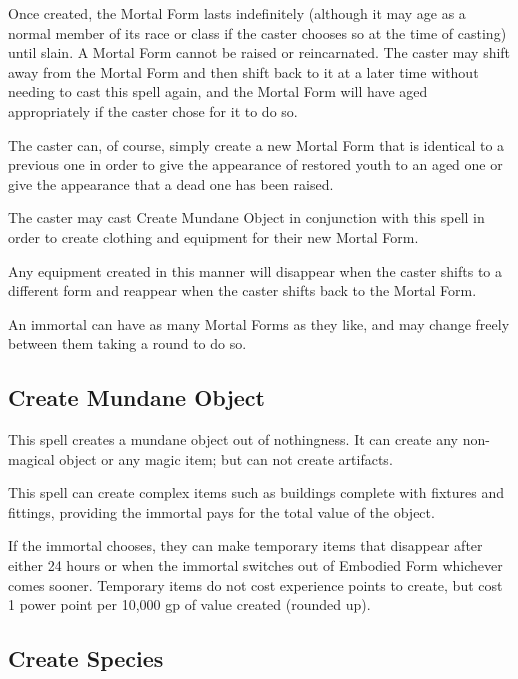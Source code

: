 \begin{multicols*}{2}
Once created, the Mortal Form lasts indefinitely (although it may age as a normal member of its race or class if the caster chooses so at the time of casting) until slain. A Mortal Form cannot be raised or reincarnated. The caster may shift away from the Mortal Form and then shift back to it at a later time without needing to cast this spell again, and the Mortal Form will have aged appropriately if the caster chose for it to do so.

The caster can, of course, simply create a new Mortal Form that is identical to a previous one in order to give the appearance of restored youth to an aged one or give the appearance that a dead one has been raised.

The caster may cast Create Mundane Object in conjunction with this spell in order to create clothing and equipment for their new Mortal Form.

Any equipment created in this manner will disappear when the caster shifts to a different form and reappear when the caster shifts back to the Mortal Form.

An immortal can have as many Mortal Forms as they like, and may change freely between them taking a round to do so.

\subsection{Create Mundane Object}

This spell creates a mundane object out of nothingness. It can create any non-magical object or any magic item; but can not create artifacts.

This spell can create complex items such as buildings complete with fixtures and fittings, providing the immortal pays for the total value of the object.

If the immortal chooses, they can make temporary items that disappear after either 24 hours or when the immortal switches out of Embodied Form whichever comes sooner. Temporary items do not cost experience points to create, but cost 1 power point per 10,000 gp of value created (rounded up).

\subsection{Create Species}
\end{multicols*}
